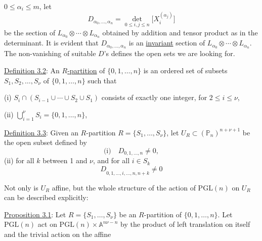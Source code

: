 
$0\leq\alpha_i\leq m$, let
\[
D_{\alpha_0,\ldots,\alpha_n}=\det_{0\leq i,j\leq n}\bigl[X_i^{(\alpha_j)}\bigr]
\]
be the section of $L_{\alpha_0}\otimes\cdots\otimes L_{\alpha_n}$ obtained by addition and tensor product as in the determinant. It is evident that $D_{\alpha_0,\ldots,\alpha_n}$ is an \uline{invariant} section of $L_{\alpha_0}\otimes\cdots\otimes L_{\alpha_n}$. The non-vanishing of suitable $D$'s defines the open sets we are looking for.

\uline{Definition 3.2}: An \uline{$R$-partition} of $\{0,1,\ldots,n\}$ is an ordered set of subsets $S_1,S_2,\ldots,S_\nu$ of $\{0,1,\ldots,n\}$ such that

(i) $S_i\cap(S_{i-1}\cup\cdots\cup S_2\cup S_1)$ consists of exactly one integer, for $2\leq i\leq\nu$,

(ii) $\displaystyle\bigcup_{i=1}^{\nu}S_i=\{0,1,\ldots,n\}$,

\uline{Definition 3.3}: Given an $R$-partition $R=\{S_1,\ldots,S_\nu\}$, let $U_R\subset(\mathbb{P}_n)^{n+\nu+1}$ be the open subset defined by
\[
\text{(i)}\quad D_{0,1,\ldots,n}\ne0,
\]
(ii) for all $k$ between 1 and $\nu$, and for all $i\in S_k$
\[
D_{0,1,\ldots,\widehat i,\ldots,n,n+k}\ne0
\]

Not only is $U_R$ affine, but the whole structure of the action of $\mathrm{PGL}(n)$ on $U_R$ can be described explicitly:

\uline{Proposition 3.1}: Let $R=\{S_1,\ldots,S_\nu\}$ be an $R$-partition of $\{0,1,\ldots,n\}$. Let $\mathrm{PGL}(n)$ act on $\mathrm{PGL}(n)\times\mathbb{A}^{n\nu-n}$ by the product of left translation on itself and the trivial action on the affine
